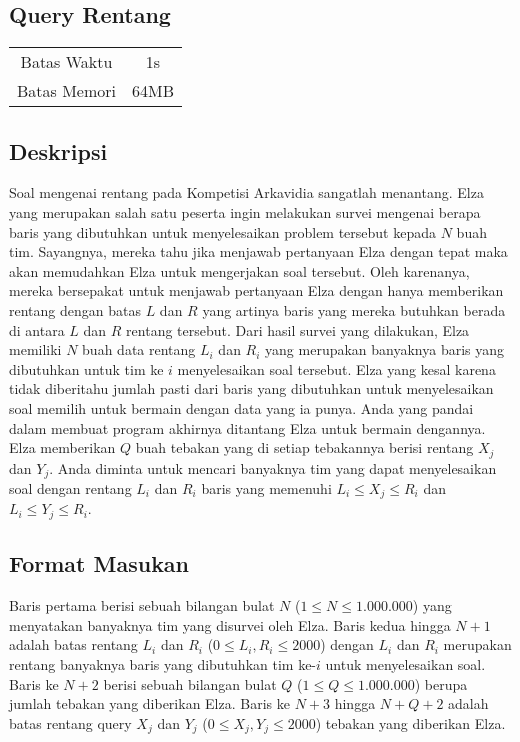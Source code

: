 \documentclass{article}
\begin{document}
\begin{center}
    \section*{Query Rentang} %

    \begin{tabular}{ | c c | }
        \hline
        Batas Waktu  & 1s \\    %
        Batas Memori & 64MB \\  %
        \hline
    \end{tabular}
\end{center}

\subsection*{Deskripsi}

Soal mengenai rentang pada Kompetisi Arkavidia sangatlah menantang.
Elza yang merupakan salah satu peserta ingin melakukan survei mengenai berapa baris yang dibutuhkan untuk menyelesaikan problem tersebut kepada $N$ buah tim.
Sayangnya, mereka tahu jika menjawab pertanyaan Elza dengan tepat maka akan memudahkan Elza untuk mengerjakan soal tersebut.
Oleh karenanya, mereka bersepakat untuk menjawab pertanyaan Elza dengan hanya memberikan rentang dengan batas $L$ dan $R$ yang artinya baris yang mereka butuhkan berada di antara $L$ dan $R$ rentang tersebut.
Dari hasil survei yang dilakukan, 
Elza memiliki $N$ buah data rentang $L_i$ dan $R_i$ yang merupakan banyaknya baris yang dibutuhkan untuk tim ke $i$ menyelesaikan soal tersebut.
Elza yang kesal karena tidak diberitahu jumlah pasti dari baris yang dibutuhkan untuk menyelesaikan soal memilih untuk bermain dengan data yang ia punya.
Anda yang pandai dalam membuat program akhirnya ditantang Elza untuk bermain dengannya.
Elza memberikan $Q$ buah tebakan yang di setiap tebakannya berisi rentang $X_j$ dan $Y_j$.
Anda diminta untuk mencari banyaknya tim yang dapat menyelesaikan soal dengan rentang $L_i$ dan $R_i$ baris yang memenuhi $L_i \leq X_j \leq R_i$ dan $L_i \leq Y_j \leq R_i$.


\subsection*{Format Masukan}
Baris pertama berisi sebuah bilangan bulat $N$ ($1 \leq N \leq 1.000.000$) yang menyatakan banyaknya tim yang disurvei oleh Elza.
Baris kedua hingga $N + 1$ adalah batas rentang $L_i$ dan $R_i$ ($0 \leq L_i,R_i \leq 2000$) dengan $L_i$ dan $R_i$ merupakan rentang banyaknya baris yang dibutuhkan tim ke-$i$ untuk menyelesaikan soal.
Baris ke $N + 2$ berisi sebuah bilangan bulat $Q$ ($1 \leq Q \leq 1.000.000$) berupa jumlah tebakan yang diberikan Elza.
Baris ke $N + 3$ hingga $N + Q + 2$ adalah batas rentang query $X_j$ dan $Y_j$ ($0 \leq X_j,Y_j \leq 2000$) tebakan yang diberikan Elza. 
\end{document}
